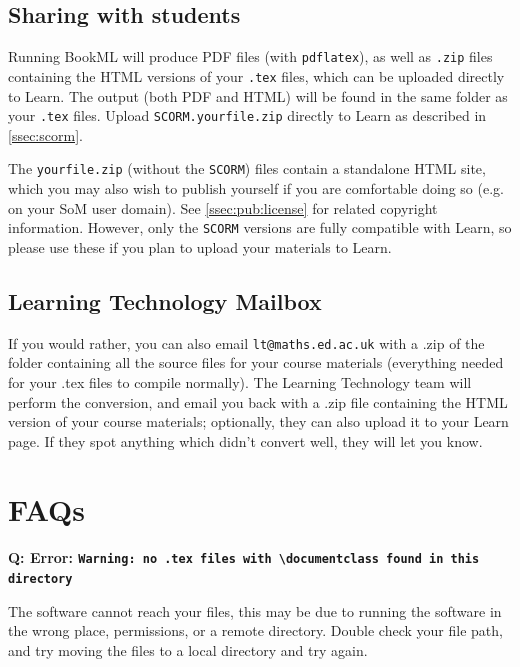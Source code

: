 \subsection{Sharing with students}
\label{ssec:local:share}

Running BookML will produce PDF files (with \verb|pdflatex|), as well as \verb|.zip| files containing the HTML versions of your \verb|.tex| files, which can be uploaded directly to Learn. The output (both PDF and HTML) will be found in the same folder as your \verb|.tex| files.
Upload \verb|SCORM.yourfile.zip| directly to Learn as described in \ref{ssec:scorm}.

The \verb|yourfile.zip| (without the \verb|SCORM|) files contain a standalone HTML site, which you may also wish to publish yourself if you are comfortable doing so (e.g. on your SoM user domain). See \ref{ssec:pub:license} for related copyright information. However, only the \verb|SCORM| versions are fully compatible with Learn, so please use these if you plan to upload your materials to Learn.


\subsection{Learning Technology Mailbox}
\label{ssec:lt}

If you would rather, you can also email \verb|lt@maths.ed.ac.uk| with a .zip of the folder containing all the source files for your course materials (everything needed for your .tex files to compile normally). The Learning Technology team will perform the conversion, and email you back with a .zip file containing the HTML version of your course materials; optionally, they can also upload it to your Learn page. If they spot anything which didn't convert well, they will let you know.


\section{FAQs}
\label{sec:FAQ}

\noindent\textbf{Q: Error: \texttt{Warning: no .tex files with \textbackslash{}documentclass found in this directory}}
\begin{ans}
    The software cannot reach your files, this may be due to running the software in the wrong place, permissions, or a remote directory. 
    Double check your file path, and try moving the files to a local directory and try again.
\end{ans}

